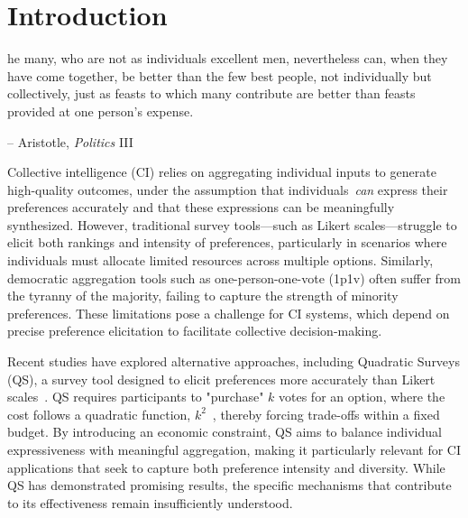 \section{Introduction}

\begin{displayquote}
[T]he many, who are not as individuals excellent men, nevertheless can, when they have come together, be better than the few best people, not individually but collectively, just as feasts to which many contribute are better than feasts provided at one person's expense.

\begin{flushright}
-- Aristotle, \textit{Politics} III
\end{flushright}
\end{displayquote}

Collective intelligence (CI) relies on aggregating individual inputs to generate high-quality outcomes, under the assumption that individuals~\textit{can} express their preferences accurately and that these expressions can be meaningfully synthesized. However, traditional survey tools—such as Likert scales—struggle to elicit both rankings and intensity of preferences, particularly in scenarios where individuals must allocate limited resources across multiple options. Similarly, democratic aggregation tools such as one-person-one-vote (1p1v) often suffer from the tyranny of the majority, failing to capture the strength of minority preferences. These limitations pose a challenge for CI systems, which depend on precise preference elicitation to facilitate collective decision-making.

Recent studies have explored alternative approaches, including Quadratic Surveys (QS), a survey tool designed to elicit preferences more accurately than Likert scales~\cite{chengCanShowWhat2021, quarfoot2017quadratic, cavaille2024cares}. QS requires participants to "purchase" $k$ votes for an option, where the cost follows a quadratic function, $k^2$~\cite{quarfoot2017quadratic, chengCanShowWhat2021}, thereby forcing trade-offs within a fixed budget. By introducing an economic constraint, QS aims to balance individual expressiveness with meaningful aggregation, making it particularly relevant for CI applications that seek to capture both preference intensity and diversity. While QS has demonstrated promising results, the specific mechanisms that contribute to its effectiveness remain insufficiently understood.

